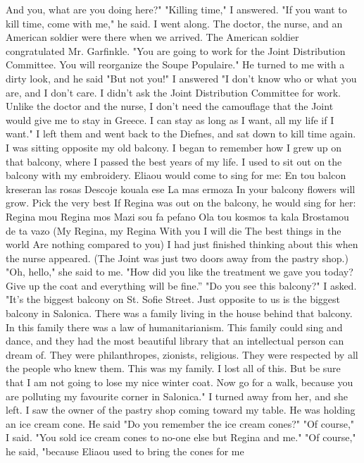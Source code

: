 And you, what are you doing 
here?"
"Killing time," I answered.
"If you want to kill time, come with me," he said.
I went along.
The doctor, the nurse, and an American soldier were there when we 
arrived.
The American soldier congratulated Mr.
Garfinkle.
"You are 
going to work for the Joint Distribution Committee.
You will reorganize 
the Soupe Populaire."
He turned to me with a dirty look, and he said 
"But not you!"
I answered "I don't know who or what you are, and I don't care.
I 
didn't ask the Joint Distribution Committee for work.
Unlike the doctor 
and the nurse, I don't need the camouflage that the Joint would give me 
to stay in Greece.
I can stay as long as I want, all my life if I want."
I left them and went back to the Diefnes, and sat down to kill time again.
I was sitting opposite my old balcony.
I began to remember how I 
grew up on that balcony, where I passed the best years of my life.
I 
used to sit out on the balcony with my embroidery.
Eliaou would come 
to sing for me: 
En tou balcon kreseran las rosas 
Descoje kouala ese 
La mas ermoza 
In your balcony flowers will grow.
Pick the very best
If Regina was out on the balcony, he would sing for her: 
Regina mou Regina mos 
Mazi sou fa pefano 
Ola tou kosmos ta kala 
Brostamou de ta vazo 
(My Regina, my Regina 
With you I will die 
The best things in the world 
Are nothing compared to you) 
I had just finished thinking about this when the nurse appeared.
(The Joint was just two doors away from the pastry shop.)
"Oh, hello," she said to me.
"How did you like the treatment we 
gave you today?
Give up the coat and everything will be fine.”
"Do you see this balcony?"
I asked.
"It's the biggest balcony on 
St.
Sofie Street.
Just opposite to us is the biggest balcony in Salonica.
There was a family living in the house behind that balcony.
In this
family there was a law of humanitarianism.
This family could sing and 
dance, and they had the most beautiful library that an intellectual person can dream of.
They were philanthropes, zionists, religious.
They 
were respected by all the people who knew them.
This was my family.
I 
lost all of this.
But be sure that I am not going to lose my nice winter coat.
Now go for a walk, because you are polluting my favourite corner in Salonica."
I turned away from her, and she left.
I saw the owner of the pastry shop coming toward my table.
He was 
holding an ice cream cone.
He said "Do you remember the ice cream 
cones?"
"Of course," I said.
"You sold ice cream cones to no-one else but 
Regina and me."
"Of course," he said, "because Eliaou used to bring the cones for me 
